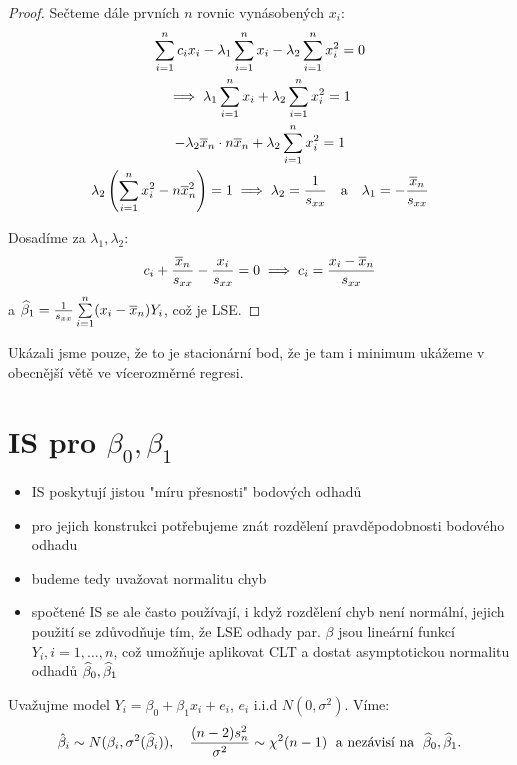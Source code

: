 \begin{proof}
	Sečteme dále prvních $n$ rovnic vynásobených $x_i$:
	\begin{gather*}
		\sum\limits_{i=1}^{n} c_i x_i - \lambda_1 \sum\limits_{i=1}^{n} x_i - \lambda_2 \sum\limits_{i=1}^{n} x_i^2 = 0 \\
		\implies \lambda_1 \sum\limits_{i=1}^{n} x_i + \lambda_2 \sum\limits_{i=1}^{n} x_i^2 = 1 \\
		 -\lambda_2 \overline{x}_n \cdot n \overline{x}_n + \lambda_2 \sum\limits_{i=1}^{n} x_i^2 = 1 \\
		 \lambda_2 \left( \sum\limits_{i=1}^{n} x_i^2 - n \overline{x}_n^2 \right) = 1 \implies \lambda_2 = \frac{1}{s_{xx}} \quad \text{a} \quad \lambda_1 = - \frac{\overline{x}_n}{s_{xx}}
	\end{gather*}
	
	Dosadíme za $\lambda_1, \lambda_2$:
	\begin{equation*}
		c_i + \frac{\overline{x}_n}{s_{xx}} - \frac{x_i}{s_{xx}} = 0 \implies c_i = \frac{x_i - \overline{x}_n}{s_{xx}}
	\end{equation*}
	a $\widehat{\beta}_1 = \frac{1}{s_{xx}} \sum\limits_{i=1}^{n} (x_i - \overline{x}_n) Y_i$, což je LSE.

\end{proof}

\begin{remark}
	Ukázali jsme pouze, že to je stacionární bod, že je tam i minimum ukážeme v obecnější větě ve vícerozměrné regresi.
\end{remark}

\section{IS pro $\beta_0, \beta_1$}

\begin{itemize}
	\item IS poskytují jistou "míru přesnosti" bodových odhadů
	\item pro jejich konstrukci potřebujeme znát rozdělení pravděpodobnosti bodového odhadu
	\item budeme tedy uvažovat normalitu chyb
	\item spočtené IS se ale často používají, i když rozdělení chyb není normální, jejich použití se zdůvodňuje tím, že LSE odhady par. $\beta$ jsou lineární funkcí $Y_i, i = 1, \dots, n$, což umožňuje aplikovat CLT a dostat asymptotickou normalitu odhadů $\widehat{\beta}_0, \widehat{\beta}_1$
\end{itemize}

Uvažujme model $Y_i = \beta_0 + \beta_1 x_i + e_i$, $e_i$ i.i.d $N(0,\sigma^2)$. Víme:
\begin{equation*}
	\hat{\beta}_i \sim N(\beta_i, \sigma^2(\widehat{\beta}_i)), \quad \frac{(n-2)s_n^2}{\sigma^2} \sim \chi^2(n-1) \text{\; a nezávisí na \;} \widehat{\beta}_0, \widehat{\beta}_1.
\end{equation*}

